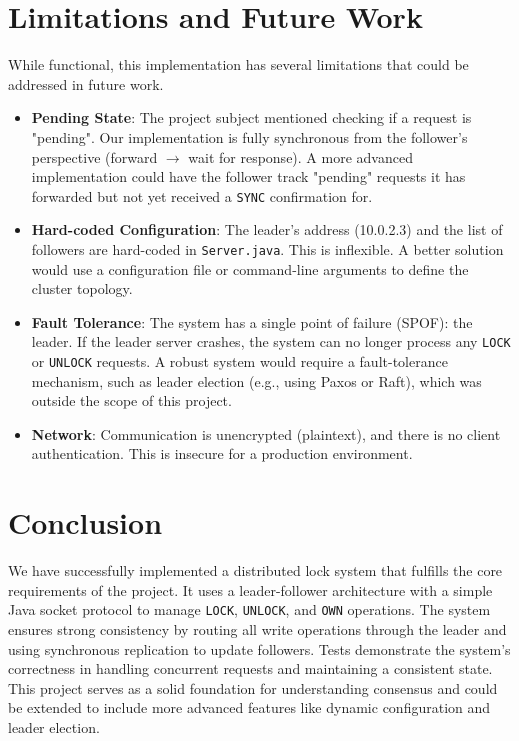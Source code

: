 \documentclass[a4paper,11pt]{article}
\begin{document}
\section{Limitations and Future Work}
While functional, this implementation has several limitations that could be addressed in future work.
\begin{itemize}
    \item \textbf{Pending State}: The project subject mentioned checking if a request is "pending". Our implementation is fully synchronous from the follower's perspective (forward $\rightarrow$ wait for response). A more advanced implementation could have the follower track "pending" requests it has forwarded but not yet received a \texttt{SYNC} confirmation for.
    \item \textbf{Hard-coded Configuration}: The leader's address (10.0.2.3) and the list of followers are hard-coded in \texttt{Server.java}. This is inflexible. A better solution would use a configuration file or command-line arguments to define the cluster topology.
    \item \textbf{Fault Tolerance}: The system has a single point of failure (SPOF): the leader. If the leader server crashes, the system can no longer process any \texttt{LOCK} or \texttt{UNLOCK} requests. A robust system would require a fault-tolerance mechanism, such as leader election (e.g., using Paxos or Raft), which was outside the scope of this project.
    \item \textbf{Network}: Communication is unencrypted (plaintext), and there is no client authentication. This is insecure for a production environment.
\end{itemize}

\section{Conclusion}
We have successfully implemented a distributed lock system that fulfills the core requirements of the project. It uses a leader-follower architecture with a simple Java socket protocol to manage \texttt{LOCK}, \texttt{UNLOCK}, and \texttt{OWN} operations. The system ensures strong consistency by routing all write operations through the leader and using synchronous replication to update followers. Tests demonstrate the system's correctness in handling concurrent requests and maintaining a consistent state. This project serves as a solid foundation for understanding consensus and could be extended to include more advanced features like dynamic configuration and leader election.
\end{document}

